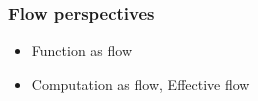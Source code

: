 \documentclass[aspectratio=169]{beamer}
\begin{document}
\begin{frame}[fragile]
    \frametitle{Flow perspectives}
    \begin{itemize}
        \item Function as flow
        \item Computation as flow, Effective flow
    \end{itemize}
    \begin{columns}
        \begin{column}{0.5\textwidth}
            \begin{center}
            \end{center}
        \end{column}
        \begin{column}{0.5\textwidth}
            \begin{figure}[ht]\centering
            \end{figure}
        \end{column}
    \end{columns}
\end{frame}
\end{document}
